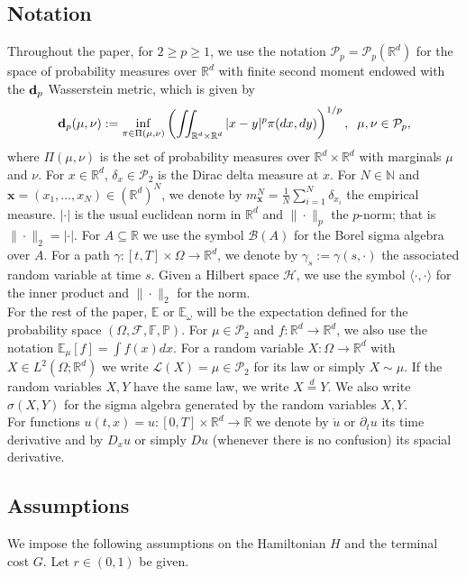 \documentclass[reqno,11pt]{amsart}
\numberwithin{equation}{section}
\newcommand{\R}{\mathbb{R}} %
\begin{document}
\subsection{Notation} Throughout the paper, for $2\ge p\ge 1$, we use the notation $\mathcal{P}_p=\mathcal{P}_p(\R^d)$ for the space of probability measures over $\R^d$ with finite second moment endowed with the ${\bf d}_p$ Wasserstein metric, which is given by
     $${\bf d}_p(\mu,\nu):=\inf_{\pi\in \Pi(\mu,\nu)}\left( \iint_{\R^d\times\R^d} |x-y|^p\pi(dx,dy)\right)^{1/p},\;\;\mu,\nu\in \mathcal{P}_p,$$
     where $\Pi(\mu,\nu)$ is the set of probability measures over $\R^d\times\R^d$ with marginals $\mu$ and $\nu$. For $x\in \R^d$, $\delta_x\in\mathcal{P}_2$ is the Dirac delta measure at $x$. For $N\in\mathbb{N}$ and $\bm x=(x_1,\ldots,x_N)\in (\R^d)^N$, we denote by $m^N_{\bm x}=\frac{1}{N}\sum_{i=1}^N\delta_{x_i}$ the empirical measure. $|\cdot|$ is the usual euclidean norm in $\R^d$ and $\|\cdot\|_p$ the $p$-norm; that is $\|\cdot\|_2=|\cdot|$. For $A\subseteq\R$ we use the symbol $\mathcal{B}(A)$ for the Borel sigma algebra over $A$. For a path $\gamma:[t,T] \times \Omega \to \mathbb{R}^d$, we denote by $\gamma_s := \gamma(s,\cdot)$ the associated random variable at time $s$. Given a Hilbert space $\mathcal{H}$, we use the symbol $\langle\cdot,\cdot\rangle$ for the inner product and $\|\cdot\|_2$ for the norm.\\
     For the rest of the paper, $\mathbb{E}$ or $\mathbb{E}_\omega$ will be the expectation defined for the probability space $(\Omega,\mathcal{F},\mathbb{F},\mathbb{P})$. For $\mu\in \mathcal{P}_2$ and $f\colon \R^d\to \R^d$, we also use the notation $\mathbb{E}_{\mu}[f]=\int f(x)dx$. For a random variable $X\colon \Omega\to\R^d$ with $X\in L^2(\Omega;\R^d)$ we write $\mathcal{L}(X)=\mu\in\mathcal{P}_2$ for its law or simply $X\sim \mu$. If the random variables $X,Y$ have the same law, we write $X\stackrel{d}{=}Y$. We also write $\sigma(X,Y)$ for the sigma algebra generated by the random variables $X,Y$.\\
     For functions $u(t,x)=u\colon[0,T]\times\R^d\to \R$ we denote by $\dot{u}$ or $\partial_tu$ its time derivative and by $D_xu$ or simply $Du$ (whenever there is no confusion) its spacial derivative.


\subsection{Assumptions}We impose the following assumptions on the Hamiltonian $H$ and the terminal cost $G$. Let $r\in (0,1)$ be given.
\vspace{3mm}
\end{document}
